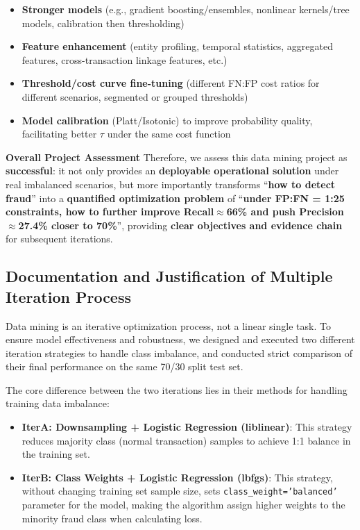 \documentclass[sigplan,screen]{acmart}
\begin{document}
\begin{itemize}
\item \textbf{Stronger models} (e.g., gradient boosting/ensembles, nonlinear kernels/tree models, calibration then thresholding)
\item \textbf{Feature enhancement} (entity profiling, temporal statistics, aggregated features, cross-transaction linkage features, etc.)
\item \textbf{Threshold/cost curve fine-tuning} (different FN:FP cost ratios for different scenarios, segmented or grouped thresholds)
\item \textbf{Model calibration} (Platt/Isotonic) to improve probability quality, facilitating better $\tau$ under the same cost function
\end{itemize}

\textbf{Overall Project Assessment} Therefore, we assess this data mining project as \textbf{successful}: it not only provides an \textbf{deployable operational solution} under real imbalanced scenarios, but more importantly transforms ``\textbf{how to detect fraud}'' into a \textbf{quantified optimization problem} of ``\textbf{under FP:FN = 1:25 constraints, how to further improve Recall$\approx$66\% and push Precision$\approx$27.4\% closer to 70\%}'', providing \textbf{clear objectives and evidence chain} for subsequent iterations.

\subsection{Documentation and Justification of Multiple Iteration Process}

Data mining is an iterative optimization process, not a linear single task. To ensure model effectiveness and robustness, we designed and executed two different iteration strategies to handle class imbalance, and conducted strict comparison of their final performance on the same 70/30 split test set.


The core difference between the two iterations lies in their methods for handling training data imbalance:

\begin{itemize}
\item \textbf{IterA: Downsampling + Logistic Regression (liblinear)}: This strategy reduces majority class (normal transaction) samples to achieve 1:1 balance in the training set.
\item \textbf{IterB: Class Weights + Logistic Regression (lbfgs)}: This strategy, without changing training set sample size, sets \texttt{class\_weight='balanced'} parameter for the model, making the algorithm assign higher weights to the minority fraud class when calculating loss.
\end{itemize}
\end{document}

